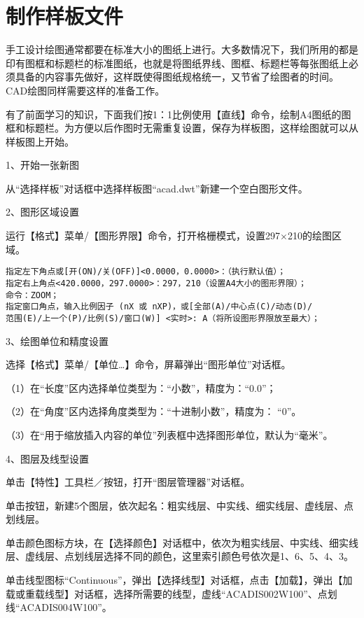 \chapter{制作样板文件}

手工设计绘图通常都要在标准大小的图纸上进行。大多数情况下，我们所用的都是印有图框和标题栏的标准图纸，也就是将图纸界线、图框、标题栏等每张图纸上必须具备的内容事先做好，这样既使得图纸规格统一，又节省了绘图者的时间。CAD绘图同样需要这样的准备工作。

有了前面学习的知识，下面我们按1：1比例使用【直线】命令，绘制A4图纸的图框和标题栏。为方便以后作图时无需重复设置，保存为样板图，这样绘图就可以从样板图上开始。

1、开始一张新图

从“选择样板”对话框中选择样板图“acad.dwt”新建一个空白图形文件。

2、图形区域设置

运行【格式】菜单/【图形界限】命令，打开格栅模式，设置297$\times$210的绘图区域。

\begin{verbatim}
指定左下角点或[开(ON)/关(OFF)]<0.0000，0.0000>：（执行默认值）；
指定右上角点<420.0000，297.0000>：297，210（设置A4大小的图形界限）；
命令：ZOOM；
指定窗口角点，输入比例因子 (nX 或 nXP)，或[全部(A)/中心点(C)/动态(D)/
范围(E)/上一个(P)/比例(S)/窗口(W)] <实时>: A（将所设图形界限放至最大）；
\end{verbatim}

3、绘图单位和精度设置

选择【格式】菜单/【单位…】命令，屏幕弹出“图形单位”对话框。

（1）在“长度”区内选择单位类型为：“小数”，精度为：“0.0”；

（2）在“角度”区内选择角度类型为：“十进制小数”，精度为： “0”。

（3）在“用于缩放插入内容的单位”列表框中选择图形单位，默认为“毫米”。

4、图层及线型设置

单击【特性】工具栏／按钮，打开“图层管理器”对话框。

单击按钮，新建5个图层，依次起名：粗实线层、中实线、细实线层、虚线层、点划线层。

单击颜色图标方块，在【选择颜色】对话框中，依次为粗实线层、中实线、细实线层、虚线层、点划线层选择不同的颜色，这里索引颜色号依次是1、6、5、4、3。

单击线型图标“Continuous”，弹出【选择线型】对话框，点击【加载】，弹出【加载或重载线型】对话框，选择所需要的线型，虚线“ACADIS002W100”、点划线“ACADIS004W100”。

